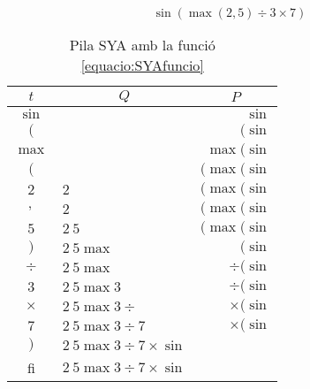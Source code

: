 \begin{equation}
\sin(\max(2, 5) \div 3 \times 7)
\label{equacio:SYAfuncio}
\end{equation}

\begin{table}[H]
    \centering
\begin{tabular}{ c l r }
$t$ & \multicolumn{1}{c}{$Q$}   & \multicolumn{1}{c}{$P$}   \\\hline
$\sin$  &   & $\sin$    \\
$($  &   & $(\sin$    \\
$\max$  &   & $\max(\sin$    \\
$($  &   & $(\max(\sin$    \\
$2$  & $2$  & $(\max(\sin$    \\
$,$  & $2$  & $(\max(\sin$    \\
$5$  & $2\ 5$  & $(\max(\sin$    \\
$)$  & $2\ 5 \max$  & $(\sin$    \\
$\div$  & $2\ 5 \max$  & $\div(\sin$    \\
$3$  & $2\ 5 \max 3$  & $\div(\sin$    \\
$\times$  & $2\ 5 \max 3 \div$  & $\times(\sin$    \\
$7$  & $2\ 5 \max 3 \div 7$  & $\times(\sin$    \\
$)$  & $2\ 5 \max 3 \div 7 \times \sin$  &     \\
fi  & $2\ 5 \max 3 \div 7 \times \sin$  &     \\
\end{tabular}
\caption{Pila SYA amb la funció \ref{equacio:SYAfuncio}}
    \label{tab:SYAf}
\end{table}